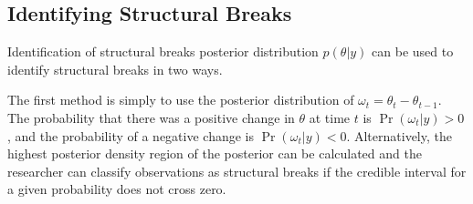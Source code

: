 \documentclass{article}
\DeclareMathOperator{\E}{E}
\begin{document}
\subsection{Identifying Structural Breaks}
\label{sec:ident-struct-breaks}

Identification of structural breaks posterior distribution $p(\theta | y)$ can be used to identify structural breaks in two ways. 

The first method is simply to use the posterior distribution of $\omega_{t} = \theta_{t} - \theta_{t-1}$.
The probability that there was a positive change in $\theta$ at time $t$ is
$\Pr(\omega_{t} | y) > 0$, and the probability of a negative change is $\Pr(\omega_{t} | y) < 0$.
Alternatively, the highest posterior density region of the posterior can be calculated and the researcher can classify observations as structural breaks if the credible interval for a given probability does not cross zero.

\end{document}
